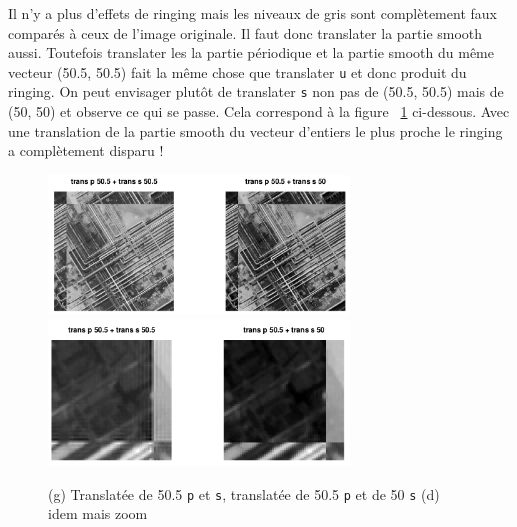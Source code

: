 \documentclass[a4paper, 11pt]{article}
\begin{document}
Il n'y a plus d'effets de ringing mais les niveaux de gris sont complètement faux comparés à ceux de l'image originale.
Il faut donc translater la partie smooth aussi. Toutefois translater les la partie périodique et la partie smooth du
même vecteur (50.5, 50.5) fait la même chose que translater \texttt{u} et donc produit du ringing. On peut envisager
plutôt de translater \texttt{s} non pas de (50.5, 50.5) mais de (50, 50) et observe ce qui se passe. Cela correspond à
la figure ~\ref{fig:bouc_trans_round} ci-dessous. Avec une translation de la partie \og smooth \fg du vecteur d'entiers le
plus proche le ringing a complètement disparu !

\begin{figure}[!h]
  \centering
  \includegraphics[width=8cm]{bouc_perdecomp_trans_50_round.png}
  \hfill
  \includegraphics[width=8cm]{bouc_perdecomp_trans_50_round_zoom.png}
  \caption{(g) Translatée de 50.5 \texttt{p} et \texttt{s},  translatée de 50.5 \texttt{p} et de 50 \texttt{s} (d) idem
  mais zoom}
  \label{fig:bouc_trans_round}
\end{figure}
\end{document}
